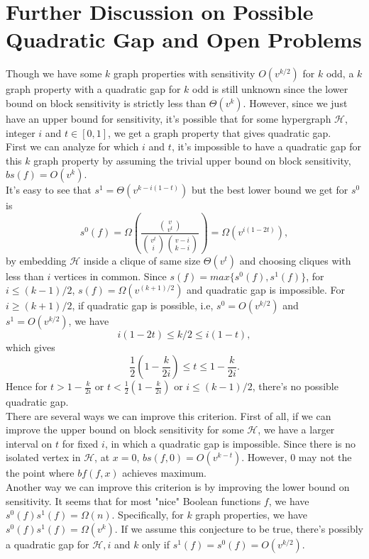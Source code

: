 \documentclass[psamsfonts]{amsart}
\theoremstyle{definition}
\theoremstyle{remark}
\numberwithin{equation}{section}
\begin{document}
	\section{Further Discussion on Possible Quadratic Gap and Open Problems}
		Though we have some $k$ graph properties with sensitivity $O(v^{k/2})$ for $k$ odd, a $k$ graph property with a quadratic gap for $k$ odd is still unknown since the lower bound on block sensitivity is strictly less than $\Theta(v^k)$. However, since we just have an upper bound for sensitivity, it's possible that for some hypergraph $\mathcal{H}$, integer $i$ and $t \in [0,1]$, we get a graph property that gives quadratic gap.\\ 
 \indent First we can analyze for which $i$ and $t$, it's impossible to have a quadratic gap for this $k$ graph property by assuming the trivial upper bound on block sensitivity, $bs(f) = O(v^k)$.\\
	\indent It's easy to see that $s^1 = \Theta(v^{k-i(1-t)})$ but the best lower bound we get for $s^0$ is 
	\begin{equation}
		s^0(f) = \Omega(\frac{{v \choose{v^t}}}{{v^t \choose{i}}{v-i \choose{k-i}}}) = \Omega(v^{i(1-2t)}),
	\end{equation}
		by embedding $\mathcal{H}$ inside a clique of same size $\Theta(v^t)$ and choosing cliques with less than $i$ vertices in common. Since $s(f) = max \{ s^0(f), s^1(f) \}$, for $i \leq (k-1)/2$, $s(f) = \Omega(v^{(k+1)/2})$ and quadratic gap is impossible. For $i \geq (k+1)/2$, if quadratic gap is possible, i.e, $s^0 = O(v^{k/2})$ and $s^1 = O(v^{k/2})$, we have
		\begin{equation}
			i(1-2t) \leq k/2 \leq i(1-t),			
		\end{equation}
		which gives
		\begin{equation}
			\frac{1}{2} (1- \frac{k}{2i}) \leq t \leq 1- \frac{k}{2i}.
		\end{equation}
		Hence for $t > 1- \frac{k}{2i}$ or $t < \frac{1}{2} (1- \frac{k}{2i})$ or $i \leq (k-1)/2$, there's no possible quadratic gap.\\
		\indent There are several ways we can improve this criterion. First of all, if we can improve the upper bound on block sensitivity for some $\mathcal{H}$, we have a larger interval on $t$ for fixed $i$, in which a quadratic gap is impossible. Since there is no isolated vertex in $\mathcal{H}$, at $x=0$, $bs(f,0) = O(v^{k-t})$. However, $0$ may not the the point where $bf(f,x)$ achieves maximum.\\
		\indent Another way we can improve this criterion is by improving the lower bound on sensitivity. It seems that for most "nice" Boolean functions $f$, we have $s^0(f)s^1(f) = \Omega(n)$. Specifically, for $k$ graph properties, we have $s^0(f)s^1(f) = \Omega(v^k)$. If we assume this conjecture to be true, there's possibly a quadratic gap for $\mathcal{H},i$ and $k$ only if $s^1(f) = s^0(f) = O(v^{k/2})$.\\
\end{document}
